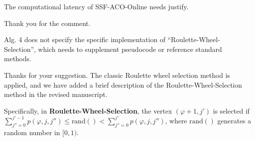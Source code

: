 \reviewer

\begin{revcomment} %
	The computational latency of SSF-ACO-Online needs justify.
\end{revcomment}
\begin{revresponse}
	Thank you for the comment.
\end{revresponse}

\begin{revcomment}
	Alg. 4 does not specify the specific implementation of ``Roulette-Wheel-Selection'', which needs to supplement pseudocode or reference standard methods.
\end{revcomment}
\begin{revresponse}
	Thanks for your suggestion.
	The classic Roulette wheel selection method is applied, and we have added a brief description of the Roulette-Wheel-Selection method in the revised manuscript.
	\begin{changes}
		Specifically, in \textbf{Roulette-Wheel-Selection}, the vertex $(\varphi+1, j')$ is selected if $\sum_{j''=0}^{j'-1}{p(\varphi,j,j'')}\leq \text{rand}() < \sum_{j''=0}^{j'}{p(\varphi,j,j'')}$, where $\text{rand}()$ generates a random number in $[0,1)$.
	\end{changes}
\end{revresponse}

